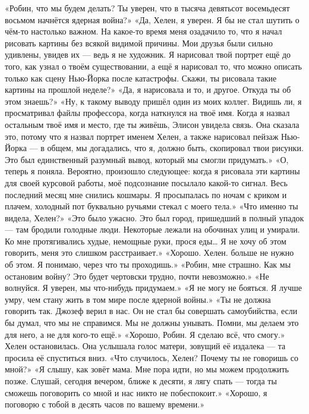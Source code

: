 \documentclass[a4paper,12pt]{book}
\begin{document}
	«Робин, что мы будем делать? Ты уверен, что в тысяча девятьсот восемьдесят восьмом начнётся ядерная война?»
	«Да, Хелен, я уверен. Я бы не стал шутить о чём-то настолько важном. На какое-то время меня озадачило то, что я начал рисовать картины без всякой видимой причины. Мои друзья были сильно удивлены, увидев их — ведь я не художник. Я нарисовал твой портрет ещё до того, как узнал о твоём существовании, а ещё я нарисовал то, что можно описать только как сцену Нью-Йорка после катастрофы. Скажи, ты рисовала такие картины на прошлой неделе?»
	«Да, я нарисовала и то, и другое. Откуда ты об этом знаешь?»
	«Ну, к такому выводу пришёл один из моих коллег. Видишь ли, я просматривал файлы профессора, когда наткнулся на твоё имя. Когда я назвал остальным твоё имя и место, где ты живёшь, Элисон увидела связь. Она сказала это, потому что я назвал портрет именем Хелен, а также нарисовал пейзаж Нью-Йорка — в общем, мы догадались, что я, должно быть, скопировал твои рисунки. Это был единственный разумный вывод, который мы смогли придумать.»
	«О, теперь я поняла. Вероятно, произошло следующее: когда я рисовала эти картины для своей курсовой работы, моё подсознание посылало какой-то сигнал. Весь последний месяц мне снились кошмары. Я просыпалась по ночам с криком и плачем, холодный пот буквально ручьями стекал с моего тела.»
	«Что именно ты видела, Хелен?»
	«Это было ужасно. Это был город, пришедший в полный упадок — там бродили голодные люди. Некоторые лежали на обочинах улиц и умирали. Ко мне протягивались худые, немощные руки, прося еды… Я не хочу об этом говорить, меня это слишком расстраивает.»
	«Хорошо. Хелен. больше не нужно об этом. Я понимаю, через что ты проходишь.»
	«Робин, мне страшно. Как мы остановим войну? Это будет чертовски трудно, почти невозможно.»
	«Не волнуйся. Я уверен, мы что-нибудь придумаем.»
	«Я не могу не бояться. Я лучше умру, чем стану жить в том мире после ядерной войны.»
	«Ты не должна говорить так. Джозеф верил в нас. Он не стал бы совершать самоубийства, если бы думал, что мы не справимся. Мы не должны унывать. Помни, мы делаем это для него, а не для кого-то ещё.»
	«Хорошо, Робин. Я сделаю всё, что смогу.»
	Хелен остановилась. Она услышала голос матери, зовущий её издалека — та просила её спуститься вниз.
	«Что случилось, Хелен? Почему ты не говоришь со мной?»
	«Я слышу, как зовёт мама. Мне пора идти, но мы можем продолжить позже. Слушай, сегодня вечером, ближе к десяти, я лягу спать — тогда ты сможешь поговорить со мной и нас никто не побеспокоит.»
	«Хорошо, я поговорю с тобой в десять часов по вашему времени.»
\end{document}
